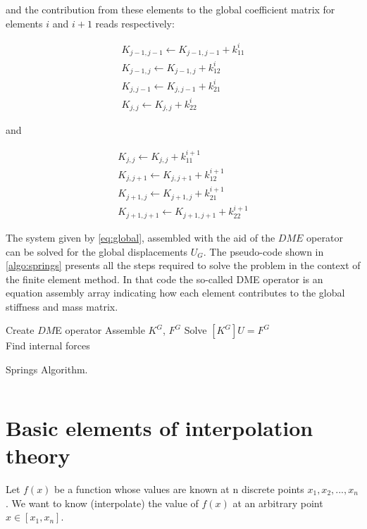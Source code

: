 and the contribution from these elements to the global coefficient matrix for elements $i$ and $i+1$ reads respectively:


\[\begin{array}{l}
{K_{j - 1,j - 1}} \leftarrow {K_{j - 1,j - 1}} + k_{11}^i\\
{K_{j - 1,j}} \leftarrow {K_{j - 1,j}} + k_{12}^i\\
{K_{j,j - 1}} \leftarrow {K_{j,j - 1}} + k_{21}^i\\
{K_{j,j}} \leftarrow {K_{j,j}} + k_{22}^i
\end{array}\]

and

\[\begin{array}{l}
{K_{j,j}} \leftarrow {K_{j,j}} + k_{11}^{i + 1}\\
{K_{j,j + 1}} \leftarrow {K_{j,j + 1}} + k_{12}^{i + 1}\\
{K_{j + 1,j}} \leftarrow {K_{j + 1,j}} + k_{21}^{i + 1}\\
{K_{j + 1,j + 1}} \leftarrow {K_{j + 1,j + 1}} + k_{22}^{i + 1}
\end{array}\]

The system given by \cref{eq:global}, assembled with the aid of the $DME$ operator can be solved for the global displacements $U_G$. The pseudo-code shown in \cref{algo:springs} presents all the steps required to solve the problem in the context of the finite element method. In that code the so-called DME operator is an equation assembly array indicating how each element contributes to the global stiffness and mass matrix.

\begin{algorithm}[H]\label{algo:springs}
    \SetAlgoLined
    Create $DM$E operator\;
    Assemble $K^G$, $F^G$\;
    Solve $[K^G]U=F^G$\\
    Find internal forces
    \caption{Springs Algorithm.}    
\end{algorithm}

\newpage

\inputminted[]{python}{src/engine.py}

\newpage


\section{Basic elements of interpolation theory}
Let $f(x)$ be a function whose values are known at n discrete points ${x_1, x_2,...,x_n}$. We want to know (interpolate) the value of $f(x)$ at an arbitrary point $x \in \left[ {{x_1},{x_n}} \right]$.

